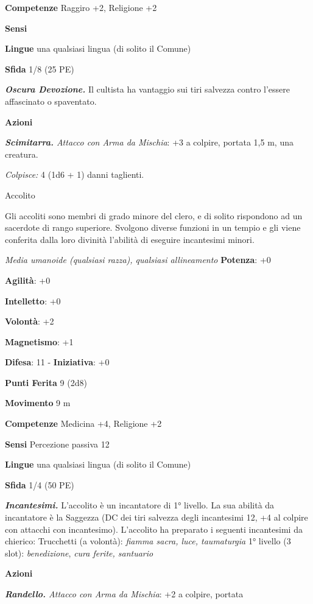 \begin{multicols}{2}
\textbf{Competenze} Raggiro +2, Religione +2

\textbf{Sensi} 

\textbf{Lingue} una qualsiasi lingua (di solito il Comune)

\textbf{Sfida} 1/8 (25 PE)

\emph{\textbf{Oscura Devozione.}} Il cultista ha vantaggio sui tiri
salvezza contro l'essere affascinato o spaventato.

\textbf{Azioni}

\emph{\textbf{Scimitarra.} Attacco con Arma da Mischia}: +3 a colpire,
portata 1,5 m, una creatura.

\emph{Colpisce:} 4 (1d6 + 1) danni taglienti.

Accolito

Gli accoliti sono membri di grado minore del clero, e di solito
rispondono ad un sacerdote di rango superiore. Svolgono diverse funzioni
in un tempio e gli viene conferita dalla loro divinità l'abilità di
eseguire incantesimi minori.

\emph{Media umanoide (qualsiasi razza), qualsiasi allineamento}
\textbf{Potenza}: +0

\textbf{Agilità}: +0

\textbf{Intelletto}: +0

\textbf{Volontà}: +2

\textbf{Magnetismo}: +1

\textbf{Difesa}: 11 - \textbf{Iniziativa}: +0

\textbf{Punti Ferita} 9 (2d8)

\textbf{Movimento} 9 m

\textbf{Competenze} Medicina +4, Religione +2

\textbf{Sensi} Percezione passiva 12

\textbf{Lingue} una qualsiasi lingua (di solito il Comune)

\textbf{Sfida} 1/4 (50 PE)

\emph{\textbf{Incantesimi.}} L'accolito è un incantatore di 1° livello.
La sua abilità da incantatore è la Saggezza (DC dei tiri salvezza degli
incantesimi 12, +4 al colpire con attacchi con incantesimo). L'accolito
ha preparato i seguenti incantesimi da chierico: Trucchetti (a volontà):
\emph{fiamma sacra, luce, taumaturgia} 1° livello (3 slot):
\emph{benedizione}, \emph{cura ferite, santuario}

\textbf{Azioni}


\emph{\textbf{Randello.} Attacco con Arma da Mischia}: +2 a colpire,
portata


\end{multicols}
